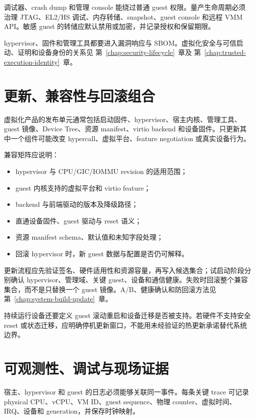 调试器、crash dump 和管理 console 能绕过普通 guest 权限。量产生命周期必须治理 JTAG、EL2/HS 调试、内存转储、snapshot、guest console 和远程 VMM API。敏感 guest 的转储应默认禁用或加密，并记录授权和保留期限。

hypervisor、固件和管理工具都要进入漏洞响应与 SBOM。虚拟化安全与可信启动、证明和设备身份的关系见 \mbox{第~\ref{chap:security-lifecycle}~章}及 \mbox{第~\ref{chap:trusted-execution-identity}~章}。

\section{更新、兼容性与回滚组合}

虚拟化产品的发布单元通常包括启动固件、hypervisor、宿主内核、管理工具、guest 镜像、Device Tree、资源 manifest、virtio backend 和设备固件。只更新其中一个组件可能改变 hypercall、虚拟平台、feature negotiation 或真实设备行为。

兼容矩阵应说明：

\begin{itemize}
  \item hypervisor 与 CPU/GIC/IOMMU revision 的适用范围；
  \item guest 内核支持的虚拟平台和 virtio feature；
  \item backend 与前端驱动的版本及降级路径；
  \item 直通设备固件、guest 驱动与 reset 语义；
  \item 资源 manifest schema、默认值和未知字段处理；
  \item 回滚 hypervisor 时，新 guest 数据与配置是否仍可解释。
\end{itemize}

更新流程应先验证签名、硬件适用性和资源容量，再写入候选集合；试启动阶段分别确认 hypervisor、管理域、关键 guest、设备和通信健康。失败时回滚整个兼容集合，而不是只替换一个 guest 镜像。A/B、健康确认和防回滚方法见 \mbox{第~\ref{chap:system-build-update}~章}。

持续运行设备还要定义 guest 滚动重启和设备迁移是否被支持。若硬件不支持安全 reset 或状态迁移，应明确停机更新窗口，不能用未经验证的热更新承诺替代系统边界。

\section{可观测性、调试与现场证据}

宿主、hypervisor 和 guest 的日志必须能够关联同一事件。每条关键 trace 可记录 physical CPU、vCPU、VM ID、guest sequence、物理 counter、虚拟时间、IRQ、设备和 generation，并保存时钟映射。

